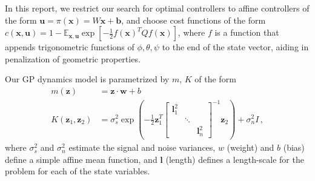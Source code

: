 \documentclass[main.tex]{subfiles}
\begin{document}
		In this report, we restrict our search for optimal controllers to affine controllers of the form
		$\bm{u} = \pi(\bm{x}) = W\bm{x} + \bm{b}$, and choose cost functions of the form
		$c(\bm{x}, \bm{u}) = 1 - \mathbb{E}_{\bm{x}, \bm{u}} \exp\left[-\frac{1}{2} f(\bm{x})^T Q f(\bm{x})\right]$, where $f$ is a function that appends trigonometric functions of $\phi, \theta, \psi$ to the end of the state vector, aiding in penalization of geometric properties.

		Our GP dynamics model is parametrized by $m$, $K$ of the form
		\begin{align}
			m(\bm{z}) &= \bm{z} \cdot \bm{w} + b \\
			K(\bm{z}_1, \bm{z}_2) &= \sigma_s^2 \exp \left(
				-\frac{1}{2}
				\bm{z}_1^T
				\begin{bmatrix}
					\bm{l}_1^2 && \\
					& \ddots & \\
					&& \bm{l}_n^2
				\end{bmatrix}^{-1}
				\bm{z}_2
			\right) + \sigma_n^2 I \,,
		\end{align}
		where $\sigma_s^2$ and $\sigma_n^2$ estimate the signal and noise variances, $w$ (weight) and $b$ (bias) define a simple affine mean function, and $\bm{l}$ (length) defines a length-scale for the problem for each of the state variables.

\bib
\end{document}
